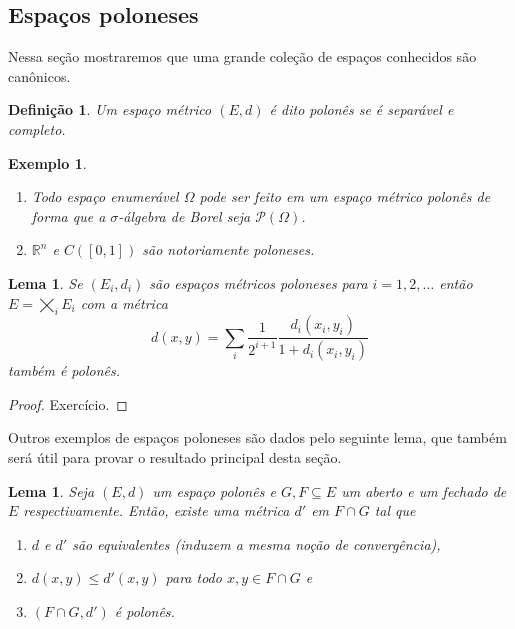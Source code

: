 \documentclass[reqno]{article}
\newcommand*\1{\mathds{1}}
\newtheorem{lemma}[theorem]{Lema}
\newtheorem{definition}[theorem]{Definição}
\newtheorem{example}{Exemplo}[section]
\begin{document}
\subsection{Espaços poloneses}

Nessa seção mostraremos que uma grande coleção de espaços conhecidos são canônicos.

\begin{definition}
  Um espaço métrico $(E,d)$ é dito polonês se é separável e completo.
\end{definition}

\begin{example} \mbox{}
  \begin{enumerate}
  \item Todo espaço enumerável $\Omega$ pode ser feito em um espaço métrico polonês de forma que a $\sigma$-álgebra de Borel seja $\mathcal{P}(\Omega)$.
  \item $\mathbb{R}^n$ e $C([0,1])$ são notoriamente poloneses.
  \end{enumerate}
\end{example}

\begin{lemma}
  Se $(E_i, d_i)$ são espaços métricos poloneses para $i = 1, 2, \dots$ então $E = \bigtimes_i E_i$ com a métrica
  \begin{equation}
    \label{e:metrica_produto}
    d(x,y) = \sum_i \frac{1}{2^{i+1}} \frac{d_i(x_i, y_i)}{1 + d_i(x_i, y_i)}
  \end{equation}
  também é polonês.
\end{lemma}

\begin{proof}
  Exercício.
\end{proof}

Outros exemplos de espaços poloneses são dados pelo seguinte lema, que também será útil para provar o resultado principal desta seção.

\begin{lemma}
  \label{l:sub_polones}
  Seja $(E,d)$ um espaço polonês e $G, F \subseteq E$ um aberto e um fechado de $E$ respectivamente.
  Então, existe uma métrica $d'$ em $F \cap G$ tal que
  \begin{enumerate}
  \item $d$ e $d'$ são equivalentes (induzem a mesma noção de convergência),
  \item $d(x,y) \leq d'(x,y)$ para todo $x, y \in F \cap G$ e
  \item $(F \cap G, d')$ é polonês.
  \end{enumerate}
\end{lemma}
\end{document}
